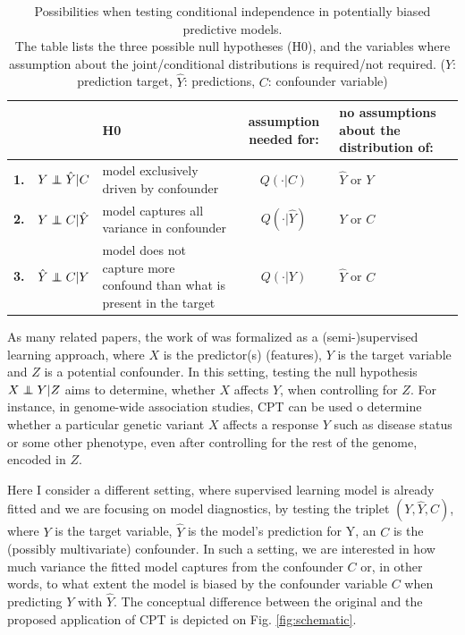 \documentclass{article}
\theoremstyle{definition}
\newcommand\independent{\protect\mathpalette{\protect\independenT}{\perp}}
\def\independenT#1#2{\mathrel{\rlap{$#1#2$}\mkern2mu{#1#2}}}
\begin{document}
\renewcommand{\arraystretch}{2}
\begin{table}[]
\centering
\begin{tabular}{l|rp{60mm}|c|>{\centering\arraybackslash}m{30mm}}
 &  & H0  & assumption needed for: & no assumptions about the distribution of: \\
\hline
\textbf{1.} & $Y \independent \hat{Y} | C$ \quad  & model exclusively driven by confounder & $Q(\cdot|C)$ & $\hat{Y}$ or $Y$ \\
\textbf{2.} & $Y \independent C | \hat{Y}$ \quad & model captures all variance in confounder & $Q(\cdot|\hat{Y})$ & $Y$ or $C$ \\
\textbf{3.} & $\hat{Y} \independent C | Y$  \quad &  model does not capture more confound than what is present in the target & $Q(\cdot|Y)$ & $\hat{Y}$ or $C$ \\
\end{tabular}
\caption{\label{tab:conditional-independence-cases} Possibilities when testing conditional independence in potentially biased predictive models. \\The table lists the three possible null hypotheses (H0), and the variables where assumption about the joint/conditional distributions is required/not required.   ($Y$: prediction target, $\hat{Y}$: predictions, $C$: confounder variable) }
\end{table}

As many related papers, the work of \cite{berrett2020conditional} was formalized as a (semi-)supervised learning approach, where $X$ is the predictor(s) (features), $Y$ is the target variable and $Z$ is a potential confounder. In this setting, testing the null hypothesis $X \independent Y | Z$ aims to determine, whether $X$ affects $Y$, when controlling for $Z$.
For instance, in genome-wide association studies, CPT can be used o determine whether a particular genetic variant $X$ affects a response $Y$ such as disease status or some other phenotype, even after controlling for the rest of the genome, encoded in $Z$.

Here I consider a different setting, where supervised learning model is already fitted and we are focusing on model diagnostics, by testing the triplet $(Y,\hat{Y}, C)$, where $Y$ is the target variable, $\hat{Y}$ is the model's prediction for Y, an $C$ is the (possibly multivariate) confounder. In such a setting, we are interested in how much variance the fitted model captures from the confounder $C$ or, in other words, to what extent the model is biased by the confounder variable $C$ when predicting $Y$ with $\hat{Y}$. The conceptual difference between the original and the proposed application of CPT is depicted on Fig. \ref{fig:schematic}.
\end{document}

